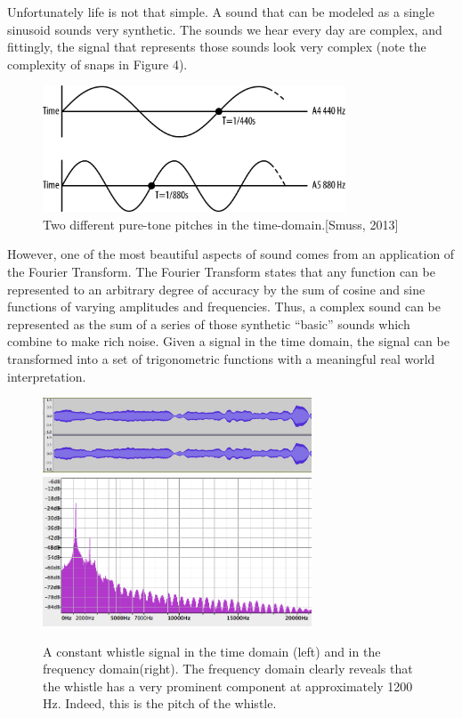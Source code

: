 \documentclass[DIV=calc, paper=a4, fontsize=11pt, twocolumn]{scrartcl}   %
\begin{document}
\par Unfortunately life is not that simple. A sound that can be modeled as a single sinusoid sounds very synthetic. The sounds we hear every day are complex, and fittingly, the signal that represents those sounds look very complex (note the complexity of snaps in Figure 4).

\begin{figure}[h]
\centering
\includegraphics[width=90mm]{figures/PitchGraph.png}
\caption{Two different pure-tone pitches in the time-domain.[Smuss, 2013]}
\label{overflow}
\end{figure}

  However, one of the most beautiful aspects of sound comes from an application of the Fourier Transform. The Fourier Transform states that any function can be represented to an arbitrary degree of accuracy by the sum of cosine and sine functions of varying amplitudes and frequencies. Thus, a complex sound can be represented as the sum of a series of those synthetic ``basic'' sounds which combine to make rich noise. Given a signal in the time domain, the signal can be transformed into a set of trigonometric functions with a meaningful real world interpretation.

\begin{figure}[h]
\centering
\includegraphics[width=80mm]{figures/whistletimedomain.png}
\includegraphics[width=80mm]{figures/frequencydomainwhistle.png}
\caption{A constant whistle signal in the time domain (left) and in the frequency domain(right). The frequency domain clearly reveals that the whistle has a very prominent component at approximately 1200 Hz. Indeed, this is the pitch of the whistle. }
\label{overflow}
\end{figure}
\end{document}
